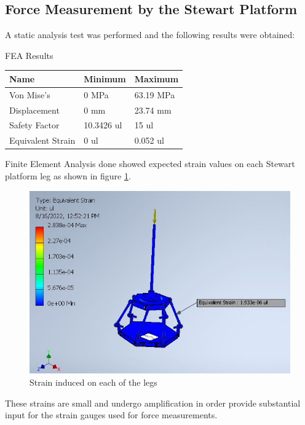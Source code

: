 \subsection{Force Measurement by the Stewart Platform}
A static analysis test was performed and the following results were obtained:
\begin{table}[H]
	\caption{FEA Results}
\end{table}
\begin{center}
	\begin{tabular}{|l|l|l|}
		\hline
		\textbf{Name}     & \textbf{Minimum} & \textbf{Maximum} \\
		\hline
		Von Mise's        & 0 MPa            & 63.19 MPa        \\
		\hline
		Displacement      & 0 mm             & 23.74 mm         \\
		\hline
		Safety Factor     & 10.3426 ul       & 15 ul            \\
		\hline
		Equivalent Strain & 0 ul             & 0.052 ul         \\
		\hline
	\end{tabular}
\end{center}
Finite Element Analysis done showed expected strain values on each
Stewart platform leg as shown in figure \ref{strain1}.

\begin{center}
	\begin{figure}[H]
		\centering
		\includegraphics[width=0.6\linewidth]{Figures/Equivalent}
		\caption[Equivalent strain]{Strain induced on each of the legs}
		\label{strain1}
	\end{figure}
\end{center}
These strains are small and undergo amplification in order provide substantial input for the strain gauges used for force measurements.


